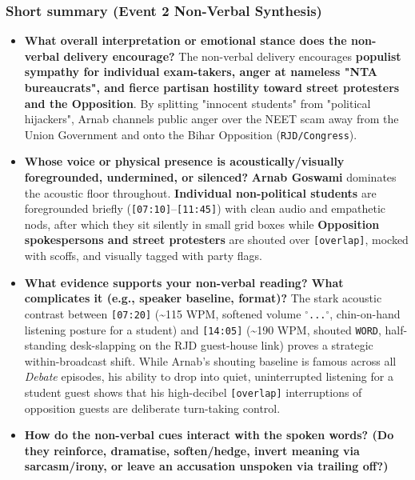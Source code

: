 \documentclass[10pt,a4paper]{article}
\begin{document}
\subsubsection*{Short summary (Event 2 Non-Verbal Synthesis)}

\begin{itemize}
  \item \textbf{What overall interpretation or emotional stance does the non-verbal delivery encourage?}
The non-verbal delivery encourages \textbf{populist sympathy for individual exam-takers, anger at nameless "NTA bureaucrats", and fierce partisan hostility toward street protesters and the Opposition}. By splitting "innocent students" from "political hijackers", Arnab channels public anger over the NEET scam away from the Union Government and onto the Bihar Opposition (\texttt{RJD/Congress}).\par\smallskip
  \item \textbf{Whose voice or physical presence is acoustically/visually foregrounded, undermined, or silenced?}
\textbf{Arnab Goswami} dominates the acoustic floor throughout. \textbf{Individual non-political students} are foregrounded briefly (\texttt{[07:10]}--\texttt{[11:45]}) with clean audio and empathetic nods, after which they sit silently in small grid boxes while \textbf{Opposition spokespersons and street protesters} are shouted over \texttt{[overlap]}, mocked with scoffs, and visually tagged with party flags.\par\smallskip
  \item \textbf{What evidence supports your non-verbal reading? What complicates it (e.g., speaker baseline, format)?}
The stark acoustic contrast between \texttt{[07:20]} (\textasciitilde{}115 WPM, softened volume \texttt{$^\circ$...$^\circ$}, chin-on-hand listening posture for a student) and \texttt{[14:05]} (\textasciitilde{}190 WPM, shouted \texttt{WORD}, half-standing desk-slapping on the RJD guest-house link) proves a strategic within-broadcast shift. While Arnab's shouting baseline is famous across all \textit{Debate} episodes, his ability to drop into quiet, uninterrupted listening for a student guest shows that his high-decibel \texttt{[overlap]} interruptions of opposition guests are deliberate turn-taking control.\par\smallskip
  \item \textbf{How do the non-verbal cues interact with the spoken words? (Do they reinforce, dramatise, soften/hedge, invert meaning via sarcasm/irony, or leave an accusation unspoken via trailing off?)}

\end{itemize}
\end{document}
